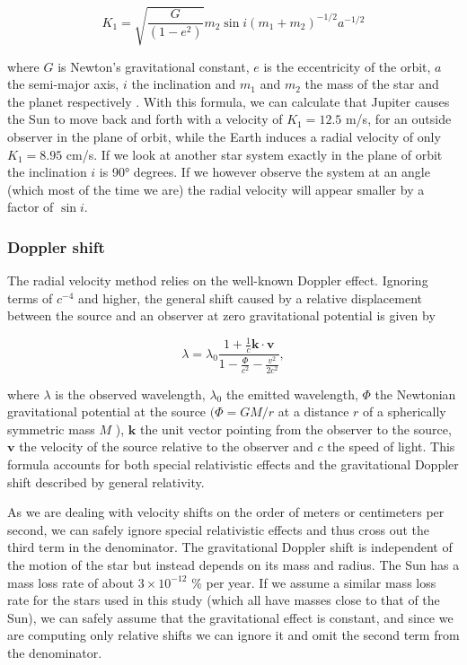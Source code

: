 \begin{equation}
    K_{1}=\sqrt{\frac{G}{\left(1-e^{2}\right)}} m_{2} \sin i\left(m_{1}+m_{2}\right)^{-1 / 2} a^{-1 / 2}
    \label{eq:rv_K}
\end{equation}

where $G$ is Newton's gravitational constant, $e$ is the eccentricity of the orbit, $a$ the semi-major axis, $i$ the inclination and $m_1$ and  $m_2$ the mass of the star and the planet respectively \cite{radial_velocity_techniques}. With this formula, we can calculate that Jupiter causes the Sun to move back and forth with a velocity of $K_1 = 12.5$ m/s, for an outside observer in the plane of orbit, while the Earth induces a radial velocity of only $K_1 = 8.95$ cm/s. If we look at another star system exactly in the plane of orbit the inclination $i$ is 90° degrees. If we however observe the system at an angle (which most of the time we are) the radial velocity will appear smaller by a factor of $\sin{i}$.

\subsubsection{Doppler shift}
The radial velocity method relies on the well-known Doppler effect. Ignoring terms of $c^{-4}$ and higher, the general shift caused by a relative displacement between the source and an observer at zero gravitational potential is given by 

\begin{equation}
    \label{eq:doppler_GR_SR}
    \lambda=\lambda_{0} \frac{1+\frac{1}{c} \mathbf{k} \cdot \mathbf{v}}{1-\frac{\Phi}{c^{2}}-\frac{v^{2}}{2 c^{2}}},
\end{equation}

where $\lambda$ is the observed wavelength, $\lambda_0$ the emitted wavelength, $\Phi$ the Newtonian gravitational potential at the source $(\Phi=G M / r$ at a distance $r$ of a spherically symmetric mass $M$ ), $\textbf{k}$ the unit vector pointing from the observer to the source, $\textbf{v}$ the velocity of the source relative to the observer and $c$ the speed of light. This formula accounts for both special relativistic effects and the gravitational Doppler shift described by general relativity\cite{doppler_shift_GR_formula}.
 
As we are dealing with velocity shifts on the order of meters or centimeters per second, we can safely ignore special relativistic effects and thus cross out the third term in the denominator. The gravitational Doppler shift is independent of the motion of the star but instead depends on its mass and radius. The Sun has a mass loss rate of about $3 \times 10^{-12}$ \% per year\cite{carroll2017introduction}. If we assume a similar mass loss rate for the stars used in this study (which all have masses close to that of the Sun), we can safely assume that the gravitational effect is constant, and since we are computing only relative shifts we can ignore it and omit the second term from the denominator.

